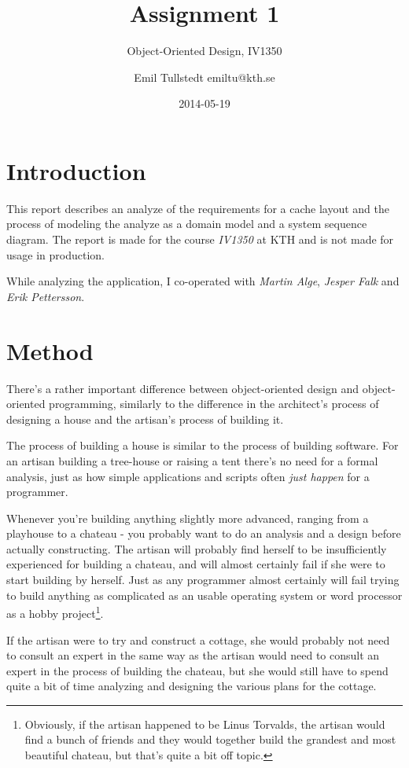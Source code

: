 \documentclass[a4paper]{scrreprt}
\title{Assignment 1}
\subtitle{Object-Oriented Design, IV1350}
\author{Emil Tullstedt emiltu@kth.se}
\date{2014-05-19}
\begin{document}
\maketitle

\tableofcontents %

\chapter{Introduction}
This report describes an analyze of the requirements for a cache layout and the process of modeling the analyze as a domain model and a system sequence diagram. The report is made for the course \textit{IV1350} at KTH and is not made for usage in production.

\begin{small}
While analyzing the application, I co-operated with \textit{Martin Alge}, \textit{Jesper Falk} and \textit{Erik Pettersson}.
\end{small}

\chapter{Method}

There's a rather important difference between object-oriented design and object-oriented programming, similarly to the difference in the architect's process of designing a house and the artisan's process of building it.

The process of building a house is similar to the process of building software. For an artisan building a tree-house or raising a tent there's no need for a formal analysis, just as how simple applications and scripts often \textit{just happen} for a programmer.

Whenever you're building anything slightly more advanced, ranging from a playhouse to a chateau - you probably want to do an analysis and a design before actually constructing. The artisan will probably find herself to be insufficiently experienced for building a chateau, and will almost certainly fail if she were to start building by herself. Just as any programmer almost certainly will fail trying to build anything as complicated as an usable operating system or word processor as a hobby project\footnote{Obviously, if the artisan happened to be Linus Torvalds, the artisan would find a bunch of friends and they would together build the grandest and most beautiful chateau, but that's quite a bit off topic.}.

If the artisan were to try and construct a cottage, she would probably not need to consult an expert in the same way as the artisan would need to consult an expert in the process of building the chateau, but she would still have to spend quite a bit of time analyzing and designing the various plans for the cottage.
\end{document}
